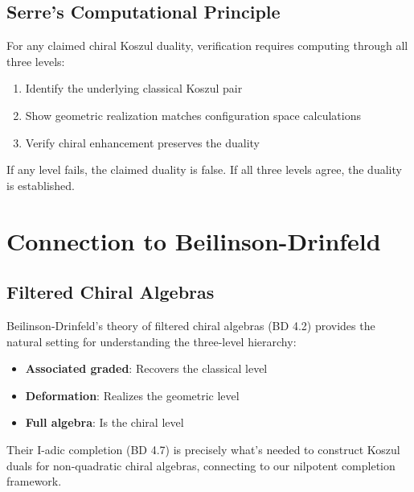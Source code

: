 \subsection{Serre's Computational Principle}

\begin{principle}\label{princ:serre-computation}
For any claimed chiral Koszul duality, verification requires computing through all three levels:

\begin{enumerate}
\item Identify the underlying classical Koszul pair
\item Show geometric realization matches configuration space calculations
\item Verify chiral enhancement preserves the duality
\end{enumerate}

If any level fails, the claimed duality is false. If all three levels agree, the duality is established.
\end{principle}

\section{Connection to Beilinson-Drinfeld}

\subsection{Filtered Chiral Algebras}

\begin{remark}\label{rem:BD-integration}
Beilinson-Drinfeld's theory of filtered chiral algebras (BD 4.2) provides the natural setting for understanding the three-level hierarchy:

\begin{itemize}
\item \textbf{Associated graded}: Recovers the classical level
\item \textbf{Deformation}: Realizes the geometric level
\item \textbf{Full algebra}: Is the chiral level
\end{itemize}

Their I-adic completion (BD 4.7) is precisely what's needed to construct Koszul duals for non-quadratic chiral algebras, connecting to our nilpotent completion framework.
\end{remark}


